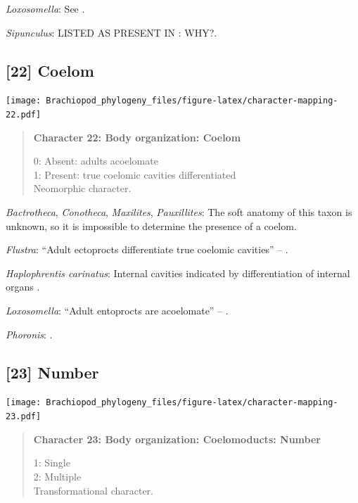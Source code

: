 \documentclass[openany]{book}
\begin{document}
\hypertarget{Loxosomella-coding-21}{}
\emph{Loxosomella}: See \citet{Haszprunar2008}.

\hypertarget{Sipunculus-coding-21}{}
\emph{Sipunculus}: LISTED AS PRESENT IN \citet{Smith2012}: WHY?.

\subsection*{{[}22{]} Coelom}\label{coelom}

\texttt{[image: Brachiopod\_phylogeny\_files/figure-latex/character-mapping-22.pdf]}

\begin{quote}
\textbf{Character 22: Body organization: Coelom}

0: Absent: adults acoelomate\\
1: Present: true coelomic cavities differentiated\\
Neomorphic character.
\end{quote}

\hypertarget{Bactrotheca-coding-22}{}
\emph{Bactrotheca}, \emph{Conotheca}, \emph{Maxilites},
\emph{Pauxillites}: The soft anatomy of this taxon is unknown, so it is
impossible to determine the presence of a coelom.

\hypertarget{Flustra-coding-22}{}
\emph{Flustra}: ``Adult ectoprocts differentiate true coelomic
cavities'' -- \citet{Fuchs2008}.

\hypertarget{Haplophrentis_carinatus-coding-22}{}
\emph{Haplophrentis carinatus}: Internal cavities indicated by
differentiation of internal organs
\citep[see][]{Moysiuk2017Hyolithsare}.

\hypertarget{Loxosomella-coding-22}{}
\emph{Loxosomella}: ``Adult entoprocts are acoelomate'' --
\citet{Fuchs2008}.

\hypertarget{Phoronis-coding-22}{}
\emph{Phoronis}: \citet{Temereva2017Innervationof}.

\subsection*{{[}23{]} Number}\label{number-1}

\texttt{[image: Brachiopod\_phylogeny\_files/figure-latex/character-mapping-23.pdf]}

\begin{quote}
\textbf{Character 23: Body organization: Coelomoducts: Number}

1: Single\\
2: Multiple\\
Transformational character.
\end{quote}
\end{document}
